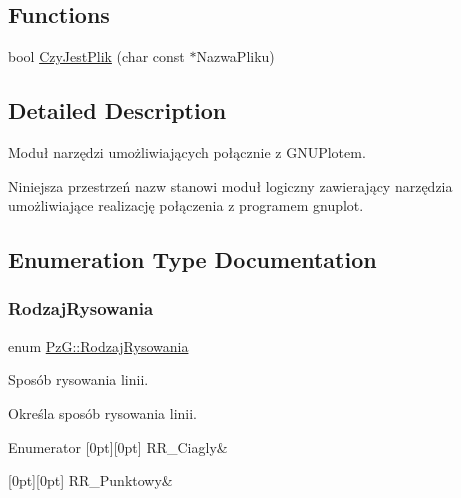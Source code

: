 \subsection*{Functions}
\begin{DoxyCompactItemize}
\item 
bool \hyperlink{namespace_pz_g_ae1ae4d36f66c77879380ba73da8e20e3}{Czy\+Jest\+Plik} (char const $\ast$Nazwa\+Pliku)
\end{DoxyCompactItemize}


\subsection{Detailed Description}
Moduł narzędzi umożliwiających połącznie z G\+N\+U\+Plotem. 

Niniejsza przestrzeń nazw stanowi moduł logiczny zawierający narzędzia umożliwiające realizację połączenia z programem {\ttfamily gnuplot}. 

\subsection{Enumeration Type Documentation}
\mbox{\label{namespace_pz_g_a705c92106f39b7d0c34a6739d10ff0b6}} 
\subsubsection{\texorpdfstring{Rodzaj\+Rysowania}{RodzajRysowania}}
{\footnotesize\ttfamily enum \hyperlink{namespace_pz_g_a705c92106f39b7d0c34a6739d10ff0b6}{Pz\+G\+::\+Rodzaj\+Rysowania}}



Sposób rysowania linii. 

Określa sposób rysowania linii. \begin{DoxyEnumFields}{Enumerator}
[0pt][0pt]{}\mbox{\label{namespace_pz_g_a705c92106f39b7d0c34a6739d10ff0b6a927eaa159aa4bd3198f0a330b967746d}} 
R\+R\+\_\+\+Ciagly&\\
\hline

[0pt][0pt]{}\mbox{\label{namespace_pz_g_a705c92106f39b7d0c34a6739d10ff0b6aa01097ee8266d6402b752ef6f9a4690c}} 
R\+R\+\_\+\+Punktowy&\\
\hline

\end{DoxyEnumFields}


